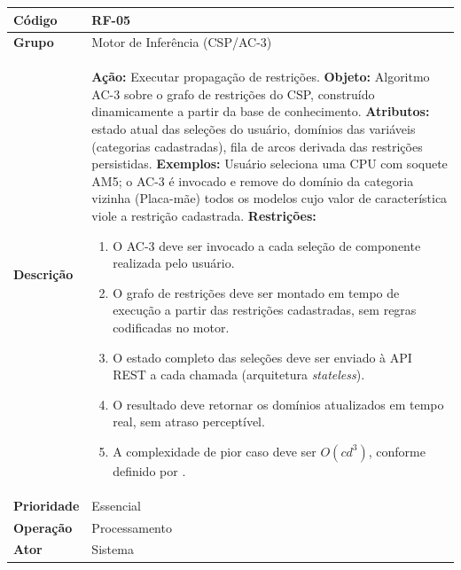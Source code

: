 \FloatBarrier
\begin{quadro}[htb]
  \caption{RF-05 -- Executar propagação de restrições via algoritmo AC-3}
  \label{quad:rf05}
  \begin{tabular}{|p{3.2cm}|p{11.8cm}|}
    \hline
    \textbf{Código}     & RF-05                                                                                                              \\ \hline
    \textbf{Grupo}      & Motor de Inferência (CSP/AC-3)                                                                                     \\ \hline
    \textbf{Descrição}  &
    \textbf{Ação:} Executar propagação de restrições.
    \textbf{Objeto:} Algoritmo AC-3 sobre o grafo de restrições do CSP, construído dinamicamente a partir da base de conhecimento.
    \textbf{Atributos:} estado atual das seleções do usuário, domínios das variáveis (categorias cadastradas), fila de arcos derivada das restrições persistidas.
    \textbf{Exemplos:} Usuário seleciona uma CPU com soquete AM5; o AC-3 é invocado e remove do domínio da categoria vizinha (Placa-mãe) todos os modelos cujo valor de característica viole a restrição cadastrada.
    \textbf{Restrições:}
    \begin{enumerate}[nosep,leftmargin=1.2em,topsep=2pt,partopsep=0pt,parsep=0pt,itemsep=1pt]
      \item O AC-3 deve ser invocado a cada seleção de componente realizada pelo usuário.
      \item O grafo de restrições deve ser montado em tempo de execução a partir das restrições cadastradas, sem regras codificadas no motor.
      \item O estado completo das seleções deve ser enviado à API REST a cada chamada (arquitetura \textit{stateless}).
      \item O resultado deve retornar os domínios atualizados em tempo real, sem atraso perceptível.
      \item A complexidade de pior caso deve ser $O(cd^{3})$, conforme definido por \textcite{Mackworth1977}.
    \end{enumerate} \\ \hline
    \textbf{Prioridade} & Essencial                                                                                                          \\ \hline
    \textbf{Operação}   & Processamento                                                                                                      \\ \hline
    \textbf{Ator}       & Sistema                                                                                                            \\ \hline
  \end{tabular}
\end{quadro}

